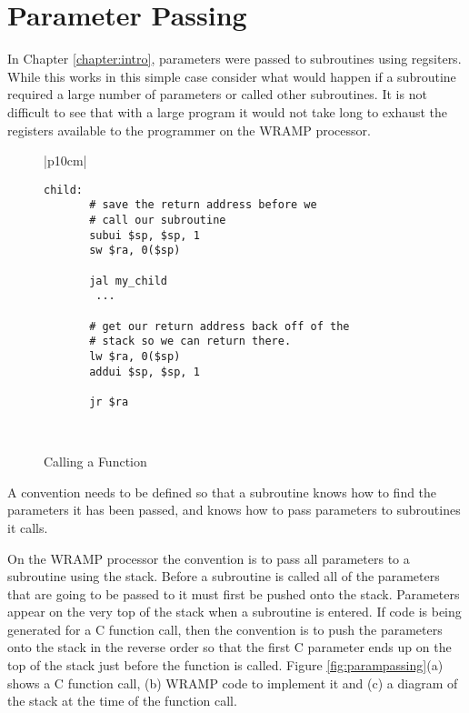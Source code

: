 

\section{Parameter Passing}
In Chapter \ref{chapter:intro}, parameters were passed to
subroutines using regsiters.  While this works in this simple case
consider what would happen if a subroutine required a large number of
parameters or called other subroutines. It is not difficult to see that
with a large program it would not take long to exhaust the registers
available to the programmer on the WRAMP processor.

%
%
\begin{figure}[!htbp]
\begin{footnotesize}
\begin{center}
\begin{tabular}{|p{10cm}|}
\hline
\begin{verbatim}
child:
       # save the return address before we
       # call our subroutine
       subui $sp, $sp, 1
       sw $ra, 0($sp)

       jal my_child
        ...

       # get our return address back off of the
       # stack so we can return there.
       lw $ra, 0($sp)
       addui $sp, $sp, 1

       jr $ra
\end{verbatim}
\\
\hline
\end{tabular}
\end{center}
\end{footnotesize}
\caption{Calling a Function}
\label{savera}
\end{figure}


A convention needs to be defined so that a subroutine knows how to
find the parameters it has been passed, and knows how to pass
parameters to subroutines it calls.

On the WRAMP processor the convention is to pass all parameters to a
subroutine using the stack. Before a subroutine is called all of the
parameters that are going to be passed to it must first be pushed onto
the stack. Parameters appear on the very top of the stack when a
subroutine is entered. If code is being generated for a C function
call, then the convention is to push the parameters onto the stack in
the reverse order so that the first C parameter ends up on the top of
the stack just before the function is called. Figure
\ref{fig:parampassing}(a) shows a C function call, (b) WRAMP code to
implement it and (c) a diagram of the stack at the time of the
function call.

